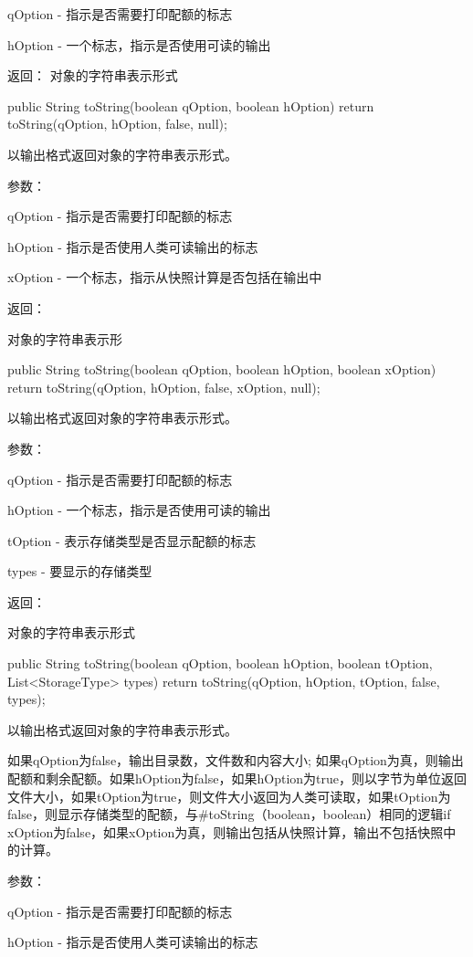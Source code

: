 \begin{java}
qOption - 指示是否需要打印配额的标志

hOption - 一个标志，指示是否使用可读的输出


返回：
对象的字符串表示形式
\begin{java}
	public String toString(boolean qOption, boolean hOption) {
	  return toString(qOption, hOption, false, null);
	}
\end{java}
以输出格式返回对象的字符串表示形式。

参数：

qOption - 指示是否需要打印配额的标志

hOption - 指示是否使用人类可读输出的标志

xOption - 一个标志，指示从快照计算是否包括在输出中

返回：

对象的字符串表示形
\begin{java}
	public String toString(boolean qOption, boolean hOption, boolean xOption) {
	  return toString(qOption, hOption, false, xOption, null);
	}
\end{java}
以输出格式返回对象的字符串表示形式。

参数：

qOption - 指示是否需要打印配额的标志

hOption - 一个标志，指示是否使用可读的输出

tOption - 表示存储类型是否显示配额的标志

types - 要显示的存储类型

返回：

对象的字符串表示形式

\begin{java}
	public String toString(boolean qOption, boolean hOption,
	                       boolean tOption, List<StorageType> types) {
	  return toString(qOption, hOption, tOption, false, types);
	}
\end{java}
以输出格式返回对象的字符串表示形式。

如果qOption为false，输出目录数，文件数和内容大小; 如果qOption为真，则输出配额和剩余配额。如果hOption为false，如果hOption为true，则以字节为单位返回文件大小，如果tOption为true，则文件大小返回为人类可读取，如果tOption为false，则显示存储类型的配额，与#toString（boolean，boolean）相同的逻辑if xOption为false，如果xOption为真，则输出包括从快照计算，输出不包括快照中的计算。

参数：

qOption - 指示是否需要打印配额的标志

hOption - 指示是否使用人类可读输出的标志


\end{java}

